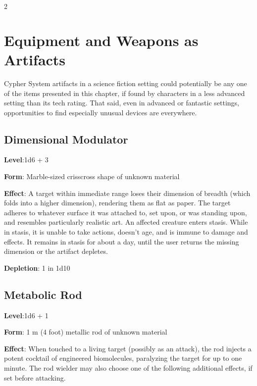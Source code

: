 \begin{multicols}{2}

\chapter{Equipment and Weapons as Artifacts}

Cypher System artifacts in a science fiction setting could potentially be any one of the items presented in this chapter, if found by characters in a less advanced setting than its tech rating. That said, even in advanced or fantastic settings, opportunities to find especially unusual devices are everywhere. 

\section{Dimensional Modulator}

\textbf{Level}:1d6 + 3 

\textbf{Form}: Marble-sized crisscross shape of unknown material 

\textbf{Effect}: A target within immediate range loses their dimension of breadth (which folds into a higher dimension), rendering them as flat as paper. The target adheres to whatever surface it was attached to, set upon, or was standing upon, and resembles particularly realistic art. An affected creature enters stasis. While in stasis, it is unable to take actions, doesn’t age, and is immune to damage and effects. It remains in stasis for about a day, until the user returns the missing dimension or the artifact depletes. 

\textbf{Depletion}: 1 in 1d10

\section{Metabolic Rod}

\textbf{Level}:1d6 + 1 

\textbf{Form}: 1 m (4 foot) metallic rod of unknown material 

\textbf{Effect}: When touched to a living target (possibly as an attack), the rod injects a potent cocktail of engineered biomolecules, paralyzing the target for up to one minute. The rod wielder may also choose one of the following additional effects, if set before attacking. 


\end{multicols}
